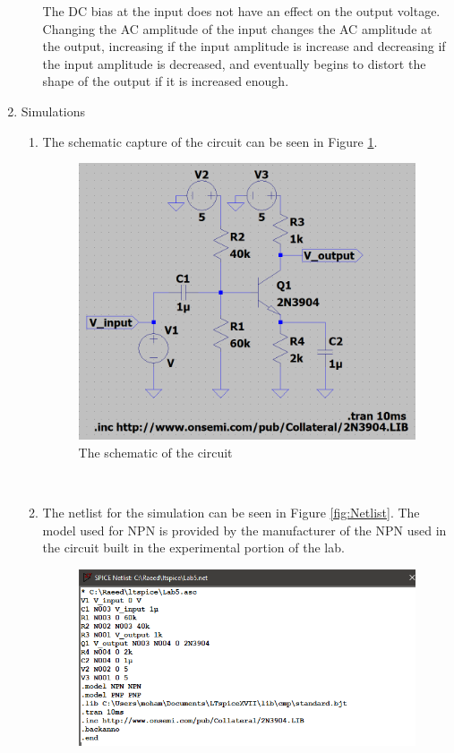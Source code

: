 \documentclass[12pt]{article}
\begin{document}
\begin{enumerate}
\begin{enumerate}
        The DC bias at the input does not have an effect on the output voltage. Changing the AC amplitude of the input changes the AC amplitude at the output, increasing if the input amplitude is increase and decreasing if the input amplitude is decreased, and eventually begins to distort the shape of the output if it is increased enough.
    \end{enumerate} \newpage
    \item Simulations
    \begin{enumerate}
        \item The schematic capture of the circuit can be seen in Figure \ref{fig:Schematic}. \\
        \begin{figure}[h!]
            \centering
            \includegraphics[width=\textwidth]{Schematic.png}
            \caption{The schematic of the circuit}
            \label{fig:Schematic}
        \end{figure} \\
        \item The netlist for the simulation can be seen in Figure \ref{fig:Netlist}. The model used for NPN is provided by the manufacturer of the NPN used in the circuit built in the experimental portion of the lab.
        \begin{figure}[h!]
            \centering
            \includegraphics[width=\textwidth]{Netlist.png}

\end{figure}
\end{enumerate}
\end{enumerate}
\end{document}
